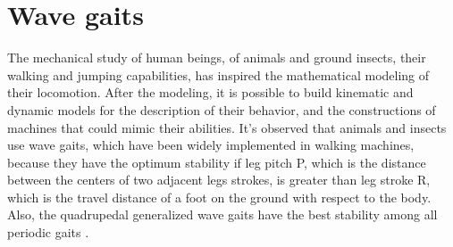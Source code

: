 \section{Wave gaits}%
\label{sec:walking}
The mechanical study of human beings, of animals and ground insects, their walking and jumping capabilities, has inspired the mathematical modeling of their locomotion. After the modeling, it is possible to build kinematic and dynamic models for the description of their behavior, and the constructions of machines that could mimic their abilities\cite{song_machines_1989,schmiedeler_mechanics_1999,migliore_biologically_2005,semini_design_2011,michele_focchi_online_2017}.
It's observed that animals and insects use wave gaits, which have been widely implemented in walking machines, because they have the optimum stability if leg pitch P, which is the distance between the centers of two adjacent legs strokes, is greater than leg stroke R, which is the travel distance of a foot on the ground with respect to the body. Also, the quadrupedal generalized wave gaits have the best stability among all periodic gaits \cite{ZHANG19931}.
